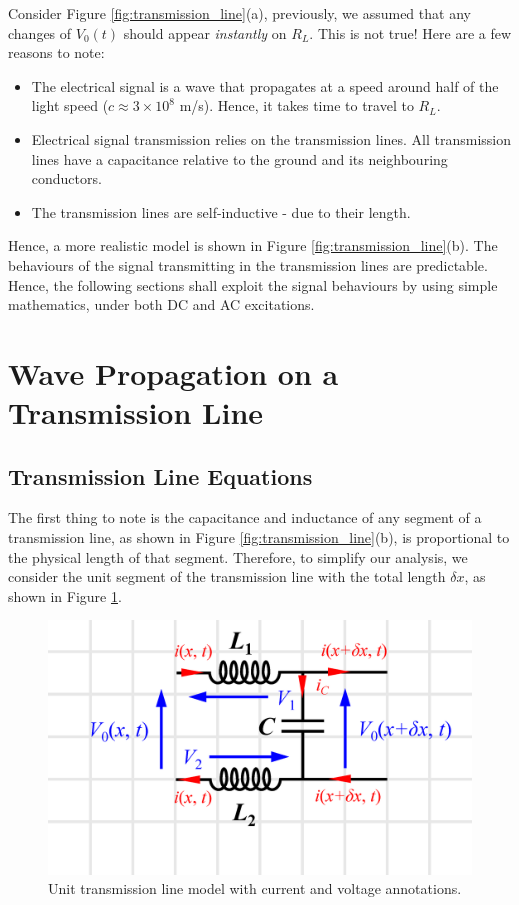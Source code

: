 \documentclass[12pt,a4paper]{article}
\begin{document}
Consider Figure \ref{fig:transmission_line}(a), previously, we assumed that any changes of $V_0(t)$ should appear \textit{instantly} on $R_L$. This is not true! Here are a few reasons to note:
\begin{itemize}
    \item The electrical signal is a wave that propagates at a speed around half of the light speed ($c \approx 3\times 10^8$ m/s). Hence, it takes time to travel to $R_L$.

    \item Electrical signal transmission relies on the transmission lines. All transmission lines have a capacitance relative to the ground and its neighbouring conductors.

    \item The transmission lines are self-inductive - due to their length.
\end{itemize}
Hence, a more realistic model is shown in Figure \ref{fig:transmission_line}(b). The behaviours of the signal transmitting in the transmission lines are predictable. Hence, the following sections shall exploit the signal behaviours by using simple mathematics, under both DC and AC excitations.
\section{Wave Propagation on a Transmission Line}
\subsection{Transmission Line Equations}
The first thing to note is the capacitance and inductance of any segment of a transmission line, as shown in Figure \ref{fig:transmission_line}(b), is proportional to the physical length of that segment. Therefore, to simplify our analysis, we consider the unit segment of the transmission line with the total length $\delta x$, as shown in Figure \ref{fig:unit_transmission_line}.

\begin{figure}[H]
    \centering
    \includegraphics[width=0.6\linewidth]{unit_transmission_line.eps}
    \caption{Unit transmission line model with current and voltage annotations.}
    \label{fig:unit_transmission_line}
\end{figure}
\end{document}
